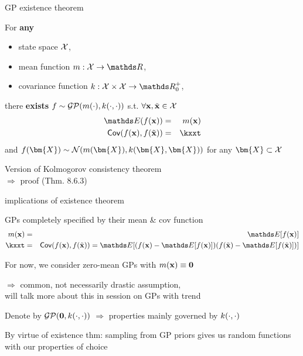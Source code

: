 \documentclass[11pt,compress,t,notes=noshow, xcolor=table]{beamer}
\begin{document}

\begin{framei}[sep=L]{GP existence theorem}
\item For \textbf{any} 
\begin{itemize}
\item state space $\mathcal{X}$,
\item mean function $m: \Xspace \rightarrow \R$,
\item covariance function $k: \Xspace \times \Xspace \rightarrow \R^+_0$, 
\end{itemize}
\vfill
there \textbf{exists} $f \sim \mathcal{GP}(m(\cdot), k(\cdot, \cdot))$ s.t. $\forall \mathbf{x}, \tilde{\mathbf{x}} \in \mathcal{X}$
\begin{eqnarray*}
\E(\fx) &=& m(\xv) \\
\cov(\fx, f(\xtil)) &=& \kxxt
\end{eqnarray*}
and $f(\bm{X}) \sim \normal(m(\bm{X}), k(\bm{X}, \bm{X}))$ for any $\bm{X} \subset \Xspace$
\item Version of Kolmogorov consistency theorem \\$\Rightarrow$ proof  (Thm. 8.6.3)
\end{framei}

\begin{framei}[sep=L]{implications of existence theorem}
\item GPs completely specified by their mean \& cov function
\begin{eqnarray*}
m(\xv) &=& \E[f(\xv)] \\
\kxxt &=& \cov(\fx, f(\xtil)) = \E [( f(\xv) - \E[f(\xv)]) ( f(\xtil) - \E[f(\xtil)] )]
\end{eqnarray*}
\item For now, we consider zero-mean GPs with $m(\mathbf{x}) \equiv \mathbf{0}$ 

$\Rightarrow$ common, not necessarily drastic assumption,\\
will talk more about this in session on GPs with trend
\item Denote by $\mathcal{GP}(\mathbf{0}, k(\cdot, \cdot))$ $\Rightarrow$ properties mainly governed by $k(\cdot, \cdot)$
\item By virtue of existence thm: sampling from GP priors gives us random functions with our properties of choice
\end{framei}
\end{document}
